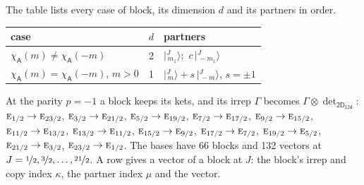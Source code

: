 \documentclass[10pt,a4paper]{article}
\numberwithin{equation}{section}
\newcommand{\grp}[1]{\mathsf{#1}}
\newcommand{\irr}[1]{\text{\normalfont\scshape #1}}
\newcommand{\chiA}{\chi_{\grp{A}}}
\newcommand{\irrprod}{\otimes}
\newcommand{\mult}{\kappa}
\newcommand{\intx}{\mu}
\newcommand{\jm}[2]{\bigl\lvert{}^{#1}_{\,#2}\bigr\rangle}
\begin{document}
\leavevmode\label{n:head.case}\label{n:head.partners}The table lists every case of block, its dimension $d$ and its partners in order.
\begin{center}\begin{tabular}{@{}lrl@{}}\toprule
case & $d$ & partners\\\midrule
$\chiA(m) \ne \chiA(-m)$ & 2 & $\jm{J}{m_1}$;\ $c\,\jm{J}{-m_1}$\\
$\chiA(m) = \chiA(-m)$, $m > 0$ & 1 & $\jm{J}{m} + s\,\jm{J}{-m}$, $s = \pm1$\\
\bottomrule\end{tabular}\end{center}
At the parity $p = -1$ a block keeps its kets, and its irrep $\Gamma$ becomes $\Gamma \irrprod \det_{\grp{2D_{12d}}}$: $\irr{e}_{1/2} \to \irr{e}_{23/2}$, $\irr{e}_{3/2} \to \irr{e}_{21/2}$, $\irr{e}_{5/2} \to \irr{e}_{19/2}$, $\irr{e}_{7/2} \to \irr{e}_{17/2}$, $\irr{e}_{9/2} \to \irr{e}_{15/2}$, $\irr{e}_{11/2} \to \irr{e}_{13/2}$, $\irr{e}_{13/2} \to \irr{e}_{11/2}$, $\irr{e}_{15/2} \to \irr{e}_{9/2}$, $\irr{e}_{17/2} \to \irr{e}_{7/2}$, $\irr{e}_{19/2} \to \irr{e}_{5/2}$, $\irr{e}_{21/2} \to \irr{e}_{3/2}$, $\irr{e}_{23/2} \to \irr{e}_{1/2}$.
The bases have 66 blocks and 132 vectors at $J = \nicefrac{1}{2}, \nicefrac{3}{2}, \dots, \nicefrac{21}{2}$. \label{n:head.vector}A row gives a vector of a block at $J$: the block's irrep and copy index $\mult$, the partner index $\intx$ and the vector.
\end{document}
